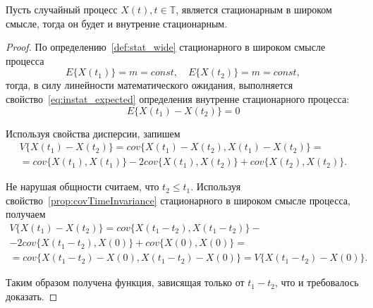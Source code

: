 \begin{Theorem}
	Пусть случайный процесс $ X(t), t \in \mathbb{T} $, является стационарным в широком смысле, тогда он будет и внутренне стационарным.
\end{Theorem}
\begin{proof}

По определению~\eqref{def:stat_wide} стационарного в широком смысле процесса
\begin{equation*}
	E \{ X(t_1) \} = m = const, \quad E \{ X(t_2) \} = m = const,
\end{equation*}
тогда, в силу линейности математического ожидания, выполняется свойство~\eqref{eq:instat_expected} определения внутренне стационарного процесса:
\begin{equation*}
	E \{ X(t_1) - X(t_2) \} = 0
\end{equation*}

Используя свойства дисперсии, запишем
\begin{equation*}\begin{gathered}
	V\{X(t_1) - X(t_2)\} = cov\{X(t_1) - X(t_2), X(t_1) - X(t_2)\} = \\
	= cov\{X(t_1), X(t_1)\} - 2cov\{X(t_1), X(t_2)\} + cov\{X(t_2), X(t_2)\}.
\end{gathered}\end{equation*}

Не нарушая общности считаем, что $ t_2 \le t_1 $. Используя свойство~\ref{prop:covTimeInvariance} стационарного в широком смысле процесса, получаем
\begin{equation*}\begin{gathered}
	V\{X(t_1) - X(t_2)\} = cov\{X(t_1 - t_2), X(t_1 - t_2)\} - \\
	- 2cov\{X(t_1 - t_2), X(0)\} + cov\{X(0), X(0)\} = \\
	= cov\{X(t_1 - t_2) - X(0), X(t_1 - t_2) - X(0)\} = V\{X(t_1 - t_2) - X(0)\}.
\end{gathered}\end{equation*}

Таким образом получена функция, зависящая только от $ t_1 - t_2 $, что и требовалось доказать.
\end{proof}

